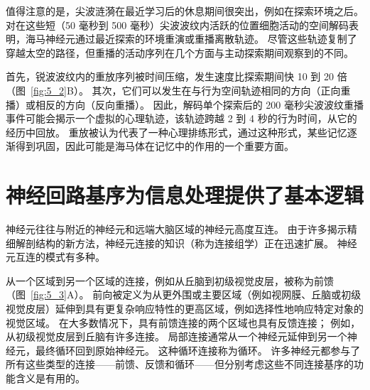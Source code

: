 值得注意的是，尖波涟漪在最近学习后的休息期间很突出，例如在探索环境之后。
对在这些短（50 毫秒到 500 毫秒）尖波波纹内活跃的位置细胞活动的空间解码表明，海马神经元通过最近探索的环境重演或重播离散轨迹。
尽管这些轨迹复制了穿越太空的路径，但重播的活动序列在几个方面与主动探索期间观察到的不同。


首先，锐波波纹内的重放序列被时间压缩，发生速度比探索期间快 10 到 20 倍（图~\ref{fig:5_2}B）。 
其次，它们可以发生在与行为空间轨迹相同的方向（正向重播）或相反的方向（反向重播）。
因此，解码单个探索后的 200 毫秒尖波波纹重播事件可能会揭示一个虚拟的心理轨迹，该轨迹跨越 2 到 4 秒的行为时间，从它的经历中回放。
重放被认为代表了一种心理排练形式，通过这种形式，某些记忆逐渐得到巩固，因此可能是海马体在记忆中的作用的一个重要方面。



\section{神经回路基序为信息处理提供了基本逻辑}

神经元往往与附近的神经元和远端大脑区域的神经元高度互连。
由于许多揭示精细解剖结构的新方法，神经元连接的知识（称为连接组学）正在迅速扩展。
神经元互连的模式有多种。


从一个区域到另一个区域的连接，例如从丘脑到初级视觉皮层，被称为前馈（图~\ref{fig:5_3}A）。 
前向被定义为从更外围或主要区域（例如视网膜、丘脑或初级视觉皮层）延伸到具有更复杂响应特性的更高区域，例如选择性地响应特定对象的视觉区域。
在大多数情况下，具有前馈连接的两个区域也具有反馈连接；
例如，从初级视觉皮层到丘脑有许多连接。
局部连接通常从一个神经元延伸到另一个神经元，最终循环回到原始神经元。
这种循环连接称为循环。
许多神经元都参与了所有这些类型的连接——前馈、反馈和循环——但分别考虑这些不同连接基序的功能含义是有用的。


